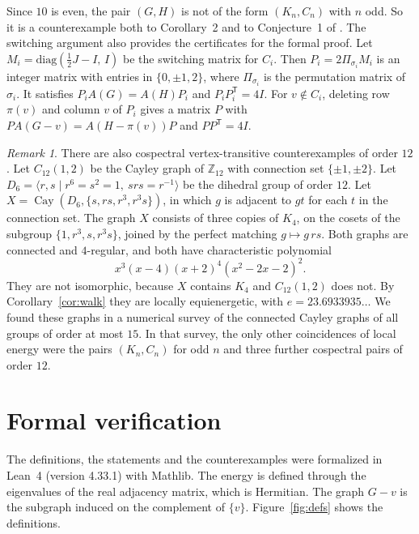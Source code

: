 \documentclass[11pt]{amsart}
\theoremstyle{remark}
\newtheorem{remark}[theorem]{Remark}
\DeclareMathOperator{\Cay}{Cay}
\begin{document}
Since $10$ is even, the pair $(G,H)$ is not of the form $(K_n,C_n)$ with $n$ odd.
So it is a counterexample both to Corollary~2 and to Conjecture~1 of \cite{DP}.
The switching argument also provides the certificates for the formal proof.
Let $M_i=\mathrm{diag}(\tfrac12J-I,\,I)$ be the switching matrix for $C_i$.
Then $P_i=2\Pi_{\sigma_i}M_i$ is an integer matrix with entries in $\{0,\pm1,2\}$, where $\Pi_{\sigma_i}$ is the permutation matrix of $\sigma_i$.
It satisfies $P_iA(G)=A(H)P_i$ and $P_iP_i^{\mathsf T}=4I$.
For $v\notin C_i$, deleting row $\pi(v)$ and column $v$ of $P_i$ gives a matrix $P$ with $PA(G-v)=A(H-\pi(v))P$ and $PP^{\mathsf T}=4I$.

\begin{remark}\label{rem:twelve}
There are also cospectral vertex-transitive counterexamples of order $12$.
Let $C_{12}(1,2)$ be the Cayley graph of $\mathbb{Z}_{12}$ with connection set $\{\pm1,\pm2\}$.
Let $D_6=\langle r,s\mid r^6=s^2=1,\ srs=r^{-1}\rangle$ be the dihedral group of order $12$.
Let $X=\Cay(D_6,\{s,rs,r^3,r^3s\})$, in which $g$ is adjacent to $gt$ for each $t$ in the connection set.
The graph $X$ consists of three copies of $K_4$, on the cosets of the subgroup $\{1,r^3,s,r^3s\}$, joined by the perfect matching $g\mapsto g\,rs$.
Both graphs are connected and $4$-regular, and both have characteristic polynomial
\[
x^3(x-4)(x+2)^4(x^2-2x-2)^2.
\]
They are not isomorphic, because $X$ contains $K_4$ and $C_{12}(1,2)$ does not.
By Corollary~\ref{cor:walk} they are locally equienergetic, with $e=23.6933935\ldots$
We found these graphs in a numerical survey of the connected Cayley graphs of all groups of order at most $15$.
In that survey, the only other coincidences of local energy were the pairs $(K_n,C_n)$ for odd $n$ and three further cospectral pairs of order $12$.
\end{remark}

\section{Formal verification}\label{sec:lean}

The definitions, the statements and the counterexamples were formalized in Lean~4 (version 4.33.1) with Mathlib.
The energy is defined through the eigenvalues of the real adjacency matrix, which is Hermitian.
The graph $G-v$ is the subgraph induced on the complement of $\{v\}$.
Figure~\ref{fig:defs} shows the definitions.
\end{document}
